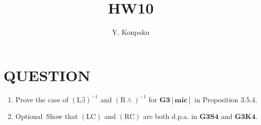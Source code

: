 \documentclass[12pt]{article}
\newcommand\PC[1]{\mathbf{#1}}
\newcommand\LC{\textrm{LC}}
\newcommand\RC{\textrm{RC}}
\newcommand\RA{\textrm{R$\land$}}
\newcommand\LX{\textrm{L$\exists$}}
\begin{document}
\title{HW10}
\author{Y. Konpaku}

\maketitle

\section{QUESTION}
\begin{enumerate}
    \item Prove the case of $(\LX)^{-1}$ and $(\RA)^{-1}$ for $\PC{G3[mic]}$ in Proposition $3.5.4$.
    \item  \lbrack Optional\rbrack\  Show that $(\LC)$ and $(\RC)$ are both d.p.a. in $\PC{G3S4}$ and $\PC{G3K4}$.
\end{enumerate}
\end{document}
